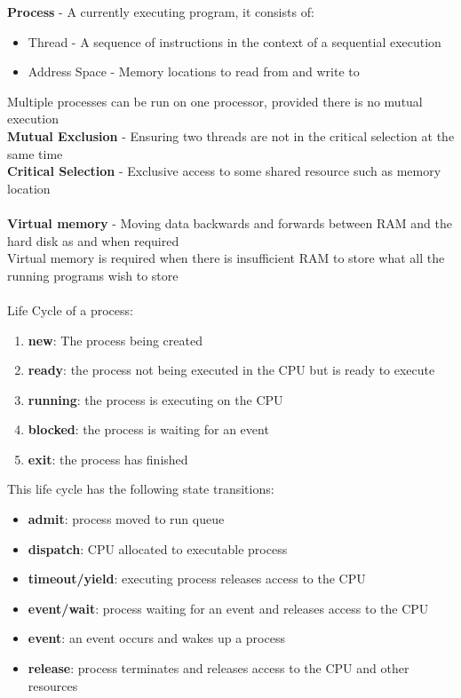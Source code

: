 \documentclass{article}[18pt]
\begin{document}
\textbf{Process} - A currently executing program, it consists of:
\begin{itemize}
	\item Thread - A sequence of instructions in the context of a sequential execution
	\item Address Space - Memory locations to read from and write to
\end{itemize}
Multiple processes can be run on one processor, provided there is no mutual execution\\
\textbf{Mutual Exclusion} - Ensuring two threads are not in the critical selection at the same time\\
\textbf{Critical Selection} - Exclusive access to some shared resource such as memory location\\
\\
\textbf{Virtual memory} - Moving data backwards and forwards between RAM and the hard disk as and when required\\
Virtual memory is required when there is insufficient RAM to store what all the running programs wish to store\\
\\
Life Cycle of a process:
\begin{enumerate}
	\item \textbf{new}: The process being created
	\item \textbf{ready}: the process not being executed in the CPU but is ready to execute
	\item \textbf{running}: the process is executing on the CPU
	\item \textbf{blocked}: the process is waiting for an event
	\item \textbf{exit}: the process has finished
\end{enumerate}
This life cycle has the following state transitions:
\begin{itemize}
	\item \textbf{admit}: process moved to run queue
	\item \textbf{dispatch}: CPU allocated to executable process
	\item \textbf{timeout/yield}: executing process releases access to the CPU
	\item \textbf{event/wait}: process waiting for an event and releases access to the CPU
	\item \textbf{event}: an event occurs and wakes up a process
	\item \textbf{release}: process terminates and releases access to the CPU and other resources
\end{itemize}
\end{document}
